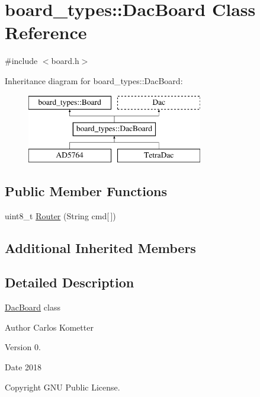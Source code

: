 \hypertarget{classboard__types_1_1DacBoard}{}\section{board\+\_\+types\+:\+:Dac\+Board Class Reference}
\label{classboard__types_1_1DacBoard}


{\ttfamily \#include $<$board.\+h$>$}

Inheritance diagram for board\+\_\+types\+:\+:Dac\+Board\+:\begin{figure}[H]
\begin{center}
\leavevmode
\includegraphics[height=3.000000cm]{classboard__types_1_1DacBoard}
\end{center}
\end{figure}
\subsection*{Public Member Functions}
\begin{DoxyCompactItemize}
\item 
uint8\+\_\+t \mbox{\hyperlink{classboard__types_1_1DacBoard_aead21571ec1138db3836de77850439f9}{Router}} (String cmd\mbox{[}$\,$\mbox{]})
\end{DoxyCompactItemize}
\subsection*{Additional Inherited Members}


\subsection{Detailed Description}
\mbox{\hyperlink{classboard__types_1_1DacBoard}{Dac\+Board}} class \begin{DoxyAuthor}{Author}
Carlos Kometter 
\end{DoxyAuthor}
\begin{DoxyVersion}{Version}
0. 
\end{DoxyVersion}
\begin{DoxyDate}{Date}
2018 
\end{DoxyDate}
\begin{DoxyCopyright}{Copyright}
G\+NU Public License. 
\end{DoxyCopyright}


